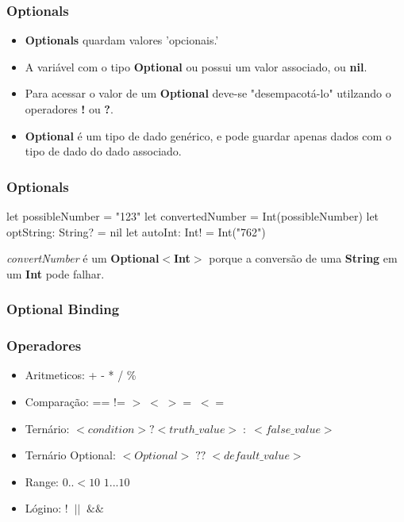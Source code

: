 \begin{frame}[fragile]
    \frametitle{Optionals}
    \begin{itemize}
        \item \textbf{Optionals} quardam valores 'opcionais.'
        \item A variável com o tipo \textbf{Optional} ou possui um valor
        associado, ou \textbf{nil}.
        \item Para acessar o valor de um \textbf{Optional} deve-se
        "desempacotá-lo" utilzando o operadores \textbf{!} ou \textbf{?}.
        \item \textbf{Optional} é um tipo de dado genérico, e pode guardar
        apenas dados com o tipo de dado do dado associado.
    \end{itemize}
\end{frame}

\begin{frame}[fragile]
    \frametitle{Optionals}

    \begin{swift}
    let possibleNumber = "123"
    let convertedNumber = Int(possibleNumber)
    let optString: String? = nil
    let autoInt: Int! = Int("762")
    \end{swift}
    \vspace{1cm}
    \textit{convertNumber} é um \textbf{Optional$<$Int$>$} porque a conversão
    de uma \textbf{String} em um \textbf{Int} pode falhar.
\end{frame}

\begin{frame}[fragile]
    \frametitle{Optional Binding}

\end{frame}

\begin{frame}[fragile]
    \frametitle{Operadores}

    \begin{itemize}
        \item Aritmeticos: + - * / \%
        \item Comparação: == != $> \; < \; >= \; <=$
        \item Ternário: $< condition > ? <truth\_value>\;:\;<false\_value> $
        \item Ternário Optional: $<Optional>\;??\;<default\_value> $
        \item Range: $0..{<}10$ $1...10$
        \item Lógino: $!\;\;||\;\;\&\&$
    \end{itemize}
\end{frame}

